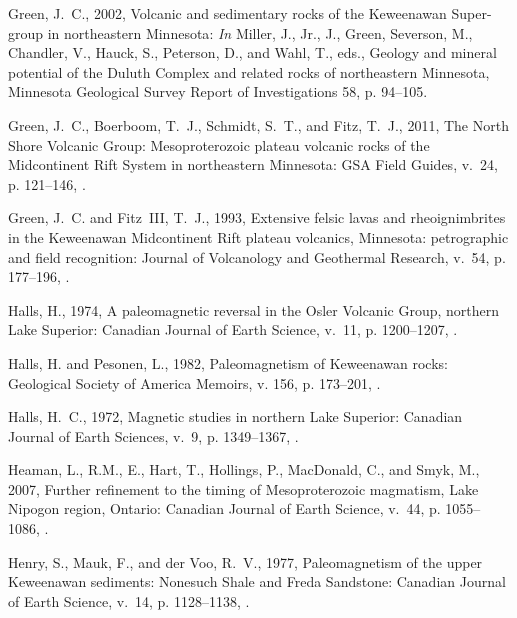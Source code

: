\documentclass[11pt,letterpaper]{article}
\begin{document}
\begin{thebibliography}{153}
Green, J.~C., 2002, {Volcanic and sedimentary rocks of the Keweenawan Super-
  group in northeastern Minnesota}: \emph{In} Miller, J., Jr., J., Green,
  Severson, M., Chandler, V., Hauck, S., Peterson, D., and Wahl, T., eds.,
  Geology and mineral potential of the Duluth Complex and related rocks of
  northeastern Minnesota, Minnesota Geological Survey Report of Investigations
  58, p. 94--105.

Green, J.~C., Boerboom, T.~J., Schmidt, S.~T., and Fitz, T.~J., 2011, {The
  North Shore Volcanic Group: Mesoproterozoic plateau volcanic rocks of the
  Midcontinent Rift System in northeastern Minnesota}: GSA Field Guides, v.~24,
  p. 121--146, .

Green, J.~C. and Fitz~III, T.~J., 1993, {Extensive felsic lavas and
  rheoignimbrites in the Keweenawan Midcontinent Rift plateau volcanics,
  Minnesota: petrographic and field recognition}: Journal of Volcanology and
  Geothermal Research, v.~54, p. 177--196, .

Halls, H., 1974, A paleomagnetic reversal in the {O}sler {V}olcanic {G}roup,
  northern {L}ake {S}uperior: Canadian Journal of Earth Science, v.~11, p.
  1200--1207, .

Halls, H. and Pesonen, L., 1982, Paleomagnetism of {K}eweenawan rocks:
  Geological Society of America Memoirs, v. 156, p. 173--201,
  .

Halls, H.~C., 1972, Magnetic studies in northern {L}ake {S}uperior: Canadian
  Journal of Earth Sciences, v.~9, p. 1349--1367, .

Heaman, L., R.M., E., Hart, T., Hollings, P., Mac{D}onald, C., and Smyk, M.,
  2007, Further refinement to the timing of {M}esoproterozoic magmatism, {L}ake
  {N}ipogon region, {O}ntario: Canadian Journal of Earth Science, v.~44, p.
  1055--1086, .

Henry, S., Mauk, F., and der Voo, R.~V., 1977, Paleomagnetism of the upper
  {K}eweenawan sediments: {N}onesuch {S}hale and {F}reda {S}andstone: Canadian
  Journal of Earth Science, v.~14, p. 1128--1138, .


\end{thebibliography}
\end{document}
